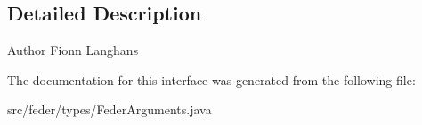 \subsection{Detailed Description}
\begin{DoxyAuthor}{Author}
Fionn Langhans 
\end{DoxyAuthor}


The documentation for this interface was generated from the following file\+:\begin{DoxyCompactItemize}
\item 
src/feder/types/Feder\+Arguments.\+java\end{DoxyCompactItemize}
